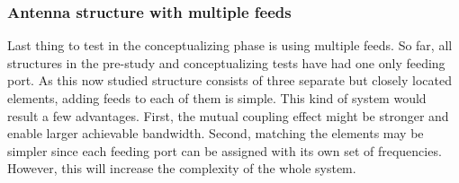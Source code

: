 \subsubsection{Antenna structure with multiple feeds}
\label{sec:multiple_feeds}
Last thing to test in the conceptualizing phase is using multiple feeds. So far, all structures in the pre-study and conceptualizing tests have had one only feeding port. As this now studied structure consists of three separate but closely located elements, adding feeds to each of them is simple. This kind of system would result a few advantages. First, the mutual coupling effect might be stronger and enable larger achievable bandwidth. Second, matching the elements may be simpler since each feeding port can be assigned with its own set of frequencies. However, this will increase the complexity of the whole system.

